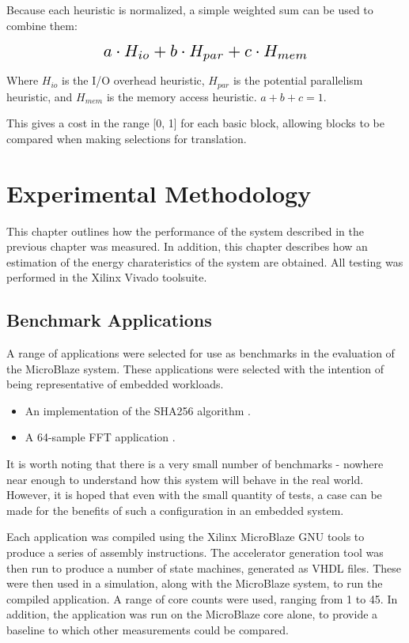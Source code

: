 \documentclass{UoYCSproject}
\begin{document}
Because each heuristic is normalized, a simple weighted sum can be used to combine them:

\begin{equation}
\scalebox{1.5}{$a \cdot H_{io} + b \cdot H_{par} + c \cdot H_{mem}$}
\end{equation}

Where \(H_{io}\) is the I/O overhead heuristic, \(H_{par}\) is the potential parallelism heuristic, and \(H_{mem}\) is the
memory access heuristic. \(a + b + c = 1\).

This gives a cost in the range [0, 1] for each basic block, allowing blocks to be compared when making selections for translation.

\chapter{Experimental Methodology}

This chapter outlines how the performance of the system described in the previous chapter was measured.
In addition, this chapter describes how an estimation of the energy charateristics of the system are obtained.
All testing was performed in the Xilinx Vivado toolsuite.

\section{Benchmark Applications}

A range of applications were selected for use as benchmarks in the evaluation of the MicroBlaze system. These applications
were selected with the intention of being representative of embedded workloads.

\begin{itemize}
  \item An implementation of the SHA256 algorithm \cite{sha256}.
  \item A 64-sample FFT application \cite{fft}.
\end{itemize}

It is worth noting that there is a very small number of benchmarks - nowhere near enough to understand how this system
will behave in the real world. However, it is hoped that even with the small quantity of tests, a case can be made for the
benefits of such a configuration in an embedded system.

Each application was compiled using the Xilinx MicroBlaze GNU tools to produce a series of assembly instructions. The
accelerator generation tool was then run to produce a number of state machines, generated as VHDL files.
These were then used in a simulation, along with the MicroBlaze system, to run the compiled application.
A range of core counts were used, ranging from 1 to 45. In addition, the application was run on the MicroBlaze core alone,
to provide a baseline to which other measurements could be compared.
\end{document}
